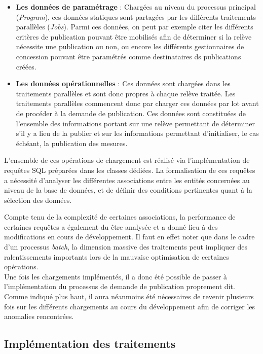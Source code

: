 \documentclass[a4paper, 12pt]{report}
\begin{document}
\begin{itemize}
  \item \textbf{Les données de paramétrage} : Chargées au niveau du processus principal (\textit{Program}), ces données statiques sont partagées par les différents traitements parallèles (\textit{Jobs}). Parmi ces données, on peut par exemple citer les différents critères de publication pouvant être mobilisés afin de déterminer si la relève nécessite une publication ou non, ou encore les différents gestionnaires de concession pouvant être paramétrés comme destinataires ds publications créées.
  \item \textbf{Les données opérationnelles} : Ces données sont chargées dans les traitements parallèles et sont donc propres à chaque relève traitée. Les traitements parallèles commencent donc par charger ces données par lot avant de procéder à la demande de publication. Ces données sont constituées de l'ensemble des informations portant sur une relève permettant de déterminer s'il y a lieu de la publier et sur les informations permettant d'initialiser, le cas échéant, la publication des mesures.
\end{itemize}
\vspace{0.5cm}

L'ensemble de ces opérations de chargement est réalisé via l'implémentation de requêtes SQL préparées dans les classes dédiées. La formalisation de ces requêtes a nécessité d'analyser les différentes associations entre les entités concernées au niveau de la base de données, et de définir des conditions pertinentes quant à la sélection des données.

Compte tenu de la complexité de certaines associations, la performance de certaines requêtes a également du être analysée et a donné lieu à des modifications en cours de développement. Il faut en effet noter que dans le cadre d'un processus \textit{batch}, la dimension massive des traitements peut impliquer des ralentissements importants lors de la mauvaise optimisation de certaines opérations.\\

Une fois les chargements implémentés, il a donc été possible de passer à l'implémentation du processus de demande de publication proprement dit. Comme indiqué plus haut, il aura néanmoins été nécessaires de revenir plusieurs fois sur les différents chargements au cours du développement afin de corriger les anomalies rencontrées.

\subsection{Implémentation des traitements}
\end{document}
